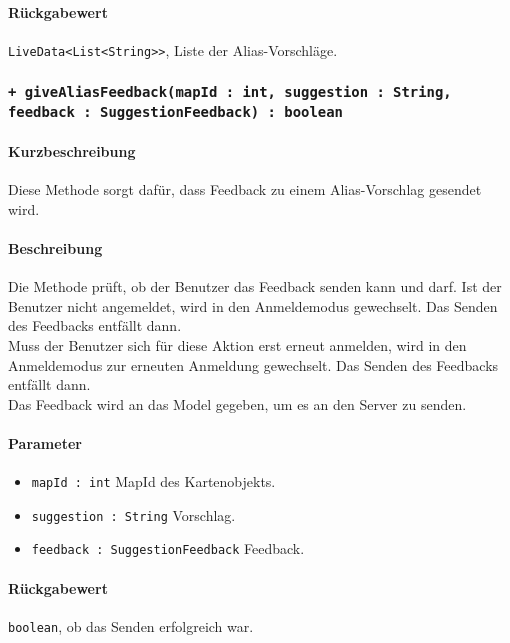 \paragraph*{Rückgabewert}
\texttt{LiveData<List<String>>}, Liste der Alias-Vorschläge.

\subsubsection*{\texttt{+ giveAliasFeedback(mapId : int, suggestion : String, feedback : SuggestionFeedback) : boolean}}%
\paragraph*{Kurzbeschreibung}
Diese Methode sorgt dafür, dass Feedback zu einem Alias-Vorschlag gesendet wird.
\paragraph*{Beschreibung}
Die Methode prüft, ob der Benutzer das Feedback senden kann und darf.
Ist der Benutzer nicht angemeldet, wird in den Anmeldemodus gewechselt. Das Senden des Feedbacks entfällt dann.\\
Muss der Benutzer sich für diese Aktion erst erneut anmelden, wird in den Anmeldemodus zur erneuten Anmeldung gewechselt. Das Senden des Feedbacks entfällt dann.\\
Das Feedback wird an das Model gegeben, um es an den Server zu senden.
\paragraph*{Parameter}
\begin{itemize}
    \item \texttt{mapId : int} MapId des Kartenobjekts.
    \item \texttt{suggestion : String} Vorschlag. 
    \item \texttt{feedback : SuggestionFeedback} Feedback.
\end{itemize}
\paragraph*{Rückgabewert}
\texttt{boolean}, ob das Senden erfolgreich war.